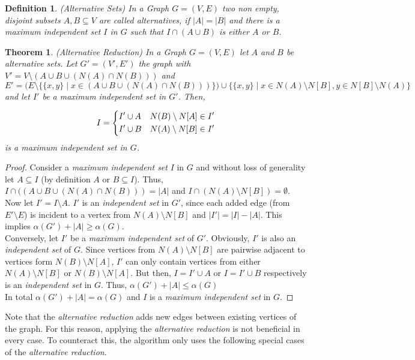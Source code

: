 \documentclass[]{article}
\newtheorem{theorem}{Theorem}
\newtheorem{definition}{Definition}
\begin{document}
\begin{definition} (Alternative Sets)
	In a Graph $G=(V,E)$ two non empty, disjoint subsets $A,B\subseteq V$ are called alternatives, if $|A| = |B|$ and there is a \textit{maximum independent set} $I$ in $G$ such that $I\cap(A\cup B)$ is either $A$ or $B$.
\end{definition}
\begin{theorem} (Alternative Reduction)
	In a Graph $G=(V,E)$ let $A$ and $B$ be alternative sets. Let $G'=(V', E')$ the graph with $V' = V\setminus(A\cup B\cup (N(A)\cap N(B)))$ and $E' = (E\setminus\{ \{x,y\}\;|\;x\in (A\cup B\cup (N(A)\cap N(B))) \})\cup \{ \{x,y\}\;|\; x\in N(A)\setminus N[B], y\in N[B]\setminus N(A) \}$ and let $I'$ be a \textit{maximum independent set} in $G'$. Then,
	
	\[I=\begin{dcases}
	I'\cup A & N(B)\setminus N[A]\in I'\\
	I'\cup B & N(A)\setminus N[B]\in I'
	\end{dcases}\]
	is a \textit{maximum independent set} in $G$.
\end{theorem}
\begin{proof}
	Consider a \textit{maximum independent set} $I$ in $G$ and without loss of generality let $A\subseteq I$ (by definition $A$ or $B \subseteq I$). Thus, $I\cap ((A\cup B\cup (N(A)\cap N(B))) = |A|$ and $I\cap(N(A)\setminus N[B])=\emptyset$. Now let $I' = I\setminus A$. $I'$ is an \textit{independent set} in $G'$, since each added edge (from $E'\setminus E$) is incident to a vertex from $N(A)\setminus N[B]$ and $|I'| = |I|-|A|$. This implies $\alpha(G')+|A| \geq \alpha(G)$.\\
	Conversely, let $I'$ be a \textit{maximum independent set} of $G'$. Obviously, $I'$ is also an \textit{independent set} of $G$. Since vertices from $N(A)\setminus N[B]$ are pairwise adjacent to vertices form $N(B)\setminus N[A]$, $I'$ can only contain vertices from either $N(A)\setminus N[B]$ or $N(B)\setminus N[A]$. But then, $I=I'\cup A$ or $I=I'\cup B$ respectively is an \textit{independent set} in $G$. Thus, $\alpha(G')+|A| \leq \alpha(G)$\\
	In total $\alpha(G')+|A| = \alpha(G)$ and $I$ is a \textit{maximum independent set} in $G$.
\end{proof}
Note that the \textit{alternative reduction} adds new edges between existing vertices of the graph. For this reason, applying the \textit{alternative reduction} is not beneficial in every case. To counteract this, the algorithm only uses the following special cases of the \textit{alternative reduction}.
\end{document}

